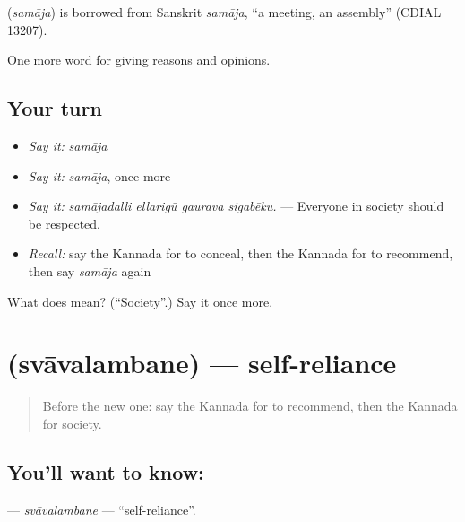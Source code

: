 \begin{cousinweb}
\textbf{} (\emph{samāja}) is borrowed from Sanskrit \emph{samāja}, \textquotedblleft{}a meeting, an assembly\textquotedblright{} (CDIAL 13207).
\end{cousinweb}

\begin{grammarlens}[title={What you've built}]
One more word for giving reasons and opinions.
\end{grammarlens}

\subsection*{Your turn}
\begin{itemize}
\raggedright
  \item \emph{Say it:} \emph{samāja}
  \item \emph{Say it:} \emph{samāja}, once more
  \item \emph{Say it:} \emph{samājadalli ellarigū gaurava sigabēku.} — Everyone in society should be respected.
  \item \emph{Recall:} say the Kannada for to conceal, then the Kannada for to recommend, then say \emph{samāja} again
\end{itemize}

\begin{tcolorbox}[breakable,colback=teal!4,colframe=teal!35!black,title={Before you move on}]
What does  mean? (\textquotedblleft{}Society\textquotedblright{}.) Say it once more.
\end{tcolorbox}
\section[\texorpdfstring{\kn{ಸ್ವಾವಲಂಬನೆ} (svāvalambane)}{ಸ್ವಾವಲಂಬನೆ (svāvalambane)}]{ (svāvalambane) — self-reliance}

\label{lesson:KA-C403-svavalambane}



\begin{quote}
Before the new one: say the Kannada for to recommend, then the Kannada for society.
\end{quote}

\subsection*{You'll want to know: }
\textbf{} — \emph{svāvalambane} — \textquotedblleft{}self-reliance\textquotedblright{}.

